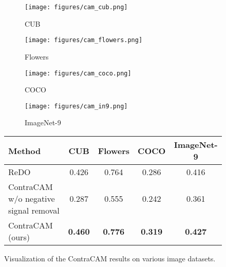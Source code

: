 \begin{figure}[t]
\centering\small
%
\begin{subfigure}{0.24\textwidth}
\texttt{[image: figures/cam\_cub.png]}
\caption{CUB \citep{welinder2010caltech}}
\end{subfigure}
\begin{subfigure}{0.24\textwidth}
\texttt{[image: figures/cam\_flowers.png]}
\caption{Flowers \citep{nilsback2006visual}}
\end{subfigure}
\begin{subfigure}{0.24\textwidth}
\texttt{[image: figures/cam\_coco.png]}
\caption{COCO \citep{lin2014microsoft}}
\end{subfigure}
\begin{subfigure}{0.24\textwidth}
\texttt{[image: figures/cam\_in9.png]}
\caption{ImageNet-9 \citep{xiao2021noise}}
\end{subfigure}
\caption{
Visualization of the ContraCAM results on various image datasets.
}\label{fig:loc-cam}
%
\label{tab:loc-main}
\begin{tabular}{lcccc}
\toprule
Method & CUB & Flowers & COCO & ImageNet-9 \\
\midrule
ReDO \citep{chen2019unsupervised}     & 0.426 & 0.764 & 0.286 & 0.416 \\
ContraCAM w/o negative signal removal & 0.287 & 0.555 & 0.242 & 0.361 \\
ContraCAM (ours) & \textbf{0.460}     & \textbf{0.776} & \textbf{0.319} & \textbf{0.427} \\
\bottomrule
\end{tabular}
%
\end{figure}
